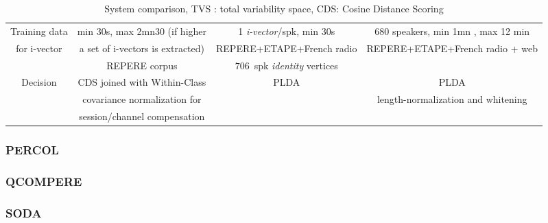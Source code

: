 \begin{table*}[t]
\begin{tabular}{|c|c|c|c|}
    \hline    
    Training data   & min 30s, max 2mn30 (if higher                 & 1 \emph{i-vector}/spk, min 30s                  &  680 speakers, min 1mn , max 12 min         \\
    for i-vector    & a set of i-vectors is extracted)              & REPERE+ETAPE+French radio                       &  REPERE+ETAPE+French radio + web         \\
                    & REPERE corpus                                 & $706$~spk \emph{identity} vertices              &           \\            
    \hline    
    Decision        & CDS joined with Within-Class                  & PLDA                                            &  PLDA         \\
                    & covariance normalization for                  &                                                 &  length-normalization and whitening         \\
                    & session/channel compensation                  &                                                 &           \\
    \hline                              
  \end{tabular}
  \caption{System comparison, TVS : total variability space, CDS: Cosine Distance Scoring}
  \label{tab:system}  
\end{table*}

\subsubsection{PERCOL}


\subsubsection{QCOMPERE}


\subsubsection{SODA}
